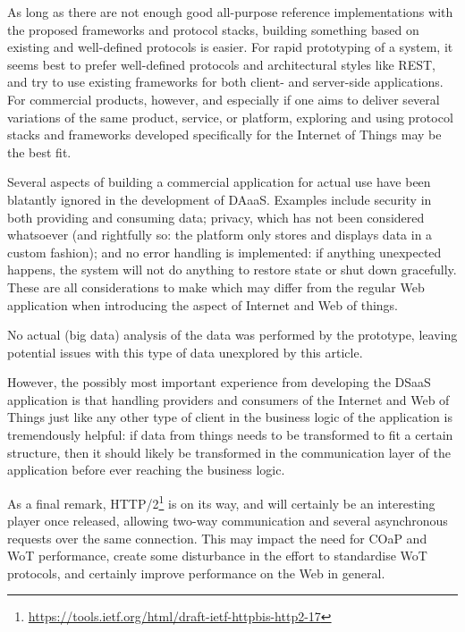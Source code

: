 As long as there are not enough good all-purpose reference implementations with the proposed frameworks and protocol stacks, building something based on existing and well-defined protocols is easier. For rapid prototyping of a system, it seems best to prefer well-defined protocols and architectural styles like REST, and try to use existing frameworks for both client- and server-side applications. For commercial products, however, and especially if one aims to deliver several variations of the same product, service, or platform, exploring and using protocol stacks and frameworks developed specifically for the Internet of Things may be the best fit.

Several aspects of building a commercial application for actual use have been blatantly ignored in the development of DAaaS. Examples include security in both providing and consuming data; privacy, which has not been considered whatsoever (and rightfully so: the platform only stores and displays data in a custom fashion); and no error handling is implemented: if anything unexpected happens, the system will not do anything to restore state or shut down gracefully. These are all considerations to make which may differ from the regular Web application when introducing the aspect of Internet and Web of things.

No actual (big data) analysis of the data was performed by the prototype, leaving potential issues with this type of data unexplored by this article.

However, the possibly most important experience from developing the DSaaS application is that handling providers and consumers of the Internet and Web of Things just like any other type of client in the business logic of the application is tremendously helpful: if data from things needs to be transformed to fit a certain structure, then it should likely be transformed in the communication layer of the application before ever reaching the business logic.

As a final remark, HTTP/2\footnote{\url{https://tools.ietf.org/html/draft-ietf-httpbis-http2-17}} is on its way, and will certainly be an interesting player once released, allowing two-way communication and several asynchronous requests over the same connection. This may impact the need for COaP and WoT performance, create some disturbance in the effort to standardise WoT protocols, and certainly improve performance on the Web in general. 
